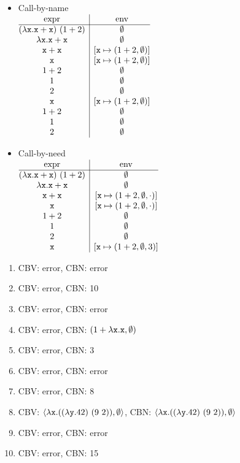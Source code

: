 \textbf{}
\begin{itemize}
  \item Call-by-name\\
$
\begin{array}{@{}c|c@{}}
  \text{expr} & \text{env} \\\hline
  \eapp{(\efun{\cx}{\eadd{\cx}{\cx}})}{(\eadd{1}{2})} & \emptyset \\
  \efun{\cx}{\eadd{\cx}{\cx}} & \emptyset \\
  \eadd{\cx}{\cx} & [\cx\mapsto\exprv{\eadd{1}{2}}{\emptyset}] \\
  \cx & [\cx\mapsto\exprv{\eadd{1}{2}}{\emptyset}] \\
  \eadd{1}{2} & \emptyset \\
  1 & \emptyset \\
  2 & \emptyset \\
  \cx & [\cx\mapsto\exprv{\eadd{1}{2}}{\emptyset}] \\
  \eadd{1}{2} & \emptyset \\
  1 & \emptyset \\
  2 & \emptyset \\
\end{array}
$
  \item Call-by-need\\
$
\begin{array}{@{}c|c@{}}
  \text{expr} & \text{env} \\\hline
  \eapp{(\efun{\cx}{\eadd{\cx}{\cx}})}{(\eadd{1}{2})} & \emptyset \\
  \efun{\cx}{\eadd{\cx}{\cx}} & \emptyset \\
  \eadd{\cx}{\cx} & [\cx\mapsto(\eadd{1}{2},\emptyset,\cdot)] \\
  \cx & [\cx\mapsto(\eadd{1}{2},\emptyset,\cdot)] \\
  \eadd{1}{2} & \emptyset \\
  1 & \emptyset \\
  2 & \emptyset \\
  \cx & [\cx\mapsto(\eadd{1}{2},\emptyset,3)] \\
\end{array}
$
\end{itemize}

\textbf{}
\begin{enumerate}
  \item CBV: error, CBN: error
  \item CBV: error, CBN: 10
  \item CBV: error, CBN: error
  \item CBV: error, CBN: $(1+\lambda\texttt{x}.\texttt{x},\emptyset)$
  \item CBV: error, CBN: 3
  \item CBV: error, CBN: error
  \item CBV: error, CBN: 8
  \item CBV: $\langle\lambda\texttt{x}.((\lambda\texttt{y}.42)\ (9\ 2)),\emptyset\rangle$,
    CBN: $\langle\lambda\texttt{x}.((\lambda\texttt{y}.42)\ (9\ 2)),\emptyset\rangle$
  \item CBV: error, CBN: error
  \item CBV: error, CBN: 15
\end{enumerate}

